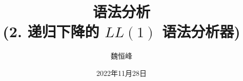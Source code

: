 \documentclass[]{beamer}
\title[语法分析]{语法分析 \\ (2. 递归下降的 $LL(1)$ 语法分析器)}
\author[魏恒峰]{\large 魏恒峰}
\institute{hfwei@nju.edu.cn}
\date{2022年11月28日}
\begin{document}
\maketitle



\thankyou{}

\end{document}
